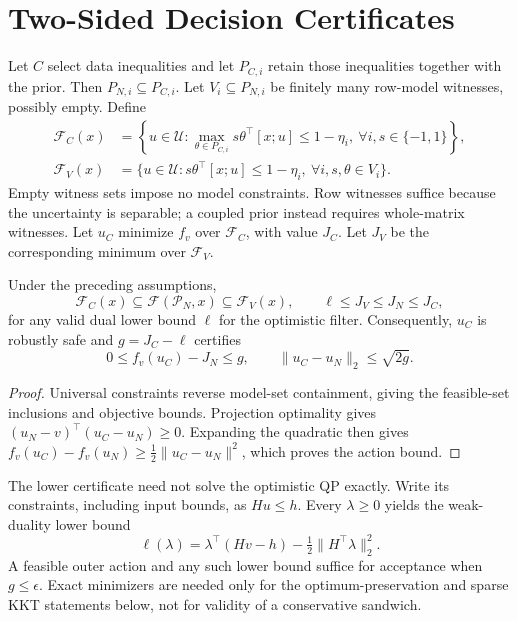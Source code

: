 \documentclass{l4dc2026}
\newcommand{\PN}{\mathcal P_N}
\newcommand{\U}{\mathcal U}
\newcommand{\F}{\mathcal F}
\begin{document}
\section{Two-Sided Decision Certificates}
Let $C$ select data inequalities and let $P_{C,i}$ retain those inequalities together with the prior. Then $P_{N,i}\subseteq P_{C,i}$. Let $V_i\subseteq P_{N,i}$ be finitely many row-model witnesses, possibly empty. Define
\begin{align}
 \F_C(x)&=\left\{u\in\U:\max_{\theta\in P_{C,i}}s\theta^\top[x;u]\leq1-\eta_i,\ \forall i,s\in\{-1,1\}\right\},\label{eq:outer}\\
 \F_V(x)&=\{u\in\U:s\theta^\top[x;u]\leq1-\eta_i,\ \forall i,s,\theta\in V_i\}.\label{eq:inner}
\end{align}
Empty witness sets impose no model constraints. Row witnesses suffice because the uncertainty is separable; a coupled prior instead requires whole-matrix witnesses. Let $u_C$ minimize $f_v$ over $\F_C$, with value $J_C$. Let $J_V$ be the corresponding minimum over $\F_V$.

\begin{theorem}\label{thm:sandwich}
Under the preceding assumptions,
\begin{equation}\label{eq:sandwich}
 \F_C(x)\subseteq\F(\PN,x)\subseteq\F_V(x),\qquad
 \ell\leq J_V\leq J_N\leq J_C,
\end{equation}
for any valid dual lower bound $\ell$ for the optimistic filter. Consequently, $u_C$ is robustly safe and $g=J_C-\ell$ certifies
\begin{equation}\label{eq:action}
 0\leq f_v(u_C)-J_N\leq g,\qquad \|u_C-u_N\|_2\leq\sqrt{2g}.
\end{equation}
\end{theorem}
\begin{proof}
Universal constraints reverse model-set containment, giving the feasible-set inclusions and objective bounds. Projection optimality gives $(u_N-v)^\top(u_C-u_N)\geq0$. Expanding the quadratic then gives $f_v(u_C)-f_v(u_N)\geq\frac12\|u_C-u_N\|^2$, which proves the action bound.
\end{proof}

The lower certificate need not solve the optimistic QP exactly. Write its constraints, including input bounds, as $Hu\leq h$. Every $\lambda\geq0$ yields the weak-duality lower bound
\begin{equation}\label{eq:dualqp}
 \ell(\lambda)=\lambda^\top(Hv-h)-\tfrac12\|H^\top\lambda\|_2^2.
\end{equation}
A feasible outer action and any such lower bound suffice for acceptance when $g\leq\epsilon$. Exact minimizers are needed only for the optimum-preservation and sparse KKT statements below, not for validity of a conservative sandwich.
\end{document}
